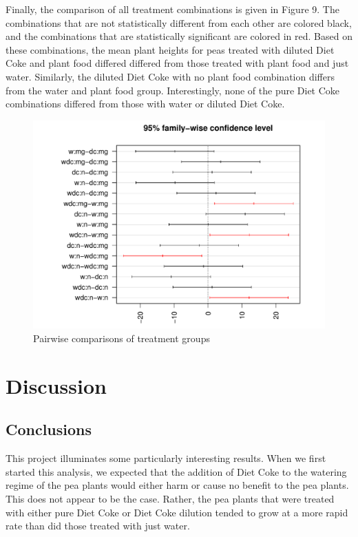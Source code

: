 \documentclass[1p,12pt]{elsarticle}\usepackage[]{graphicx}\usepackage[]{color}
\makeatletter
\def\maxwidth{ %
  \ifdim\Gin@nat@width>\linewidth
    \linewidth
  \else
    \Gin@nat@width
  \fi
}
\newenvironment{knitrout}{}{} %
\makeatother
\begin{document}
Finally, the comparison of all treatment combinations is given in Figure 9.  The combinations that are not statistically different from each other are colored black, and the combinations that are statistically significant are colored in red. Based on these combinations, the mean plant heights for peas treated with diluted Diet Coke and plant food differed differed from those treated with plant food and just water. Similarly, the diluted Diet Coke with no plant food combination differs from the water and plant food group. Interestingly, none of the pure Diet Coke combinations differed from those with water or diluted Diet Coke. 

\begin{knitrout}
\color{fgcolor}\begin{figure}

{\centering \includegraphics[width=\maxwidth]{figure/pairwise-1} 

}

\caption[Pairwise comparisons of treatment groups]{Pairwise comparisons of treatment groups}\label{fig:pairwise}
\end{figure}


\end{knitrout}


\section{Discussion}

\subsection{Conclusions}
This project illuminates some particularly interesting results. When we first started this analysis, we expected that the addition of Diet Coke to the watering regime of the pea plants would either harm or cause no benefit to the pea plants. This does not appear to be the case. Rather, the pea plants that were treated with either pure Diet Coke or Diet Coke dilution tended to grow at a more rapid rate than did those treated with just water. 
\end{document}

